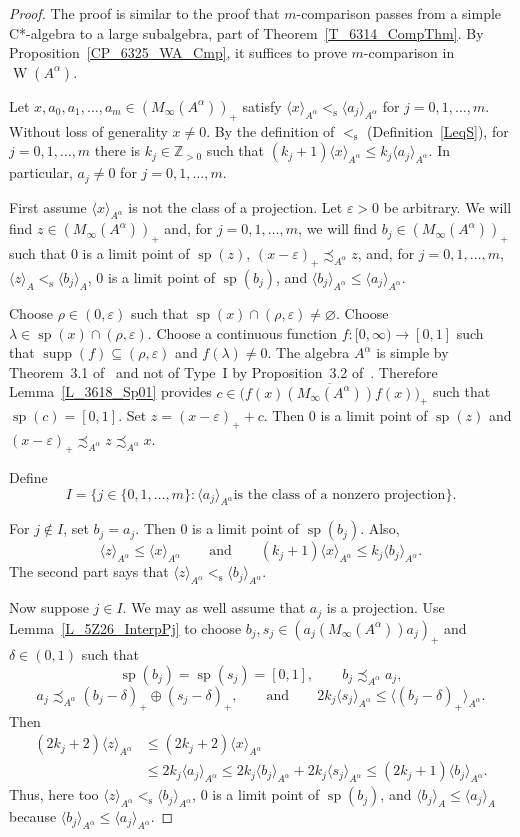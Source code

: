 \documentclass[10pt]{amsart}
\numberwithin{equation}{section}
\theoremstyle{definition}
\newcommand{\af}{\alpha}
\newcommand{\dt}{\delta}
\newcommand{\ep}{\varepsilon}
\newcommand{\ld}{\lambda}
\newcommand{\rh}{\rho}
\newcommand{\N}{{\mathbb{Z}}_{> 0}}
\newcommand{\spec}{{\operatorname{sp}}}
\newcommand{\supp}{{\operatorname{supp}}}
\newcommand{\W}{{\operatorname{W}}}
\newcommand{\andeqn}{\qquad {\mbox{and}} \qquad}
\newcommand{\Wolog}{Without loss of generality}
\newcommand{\ca}{C*-algebra}
\newcommand{\pj}{projection}
\newcommand{\cfn}{continuous function}
\renewcommand{\S}{\subseteq}
\newcommand{\I}{\infty}
\newcommand{\E}{\varnothing}
\newcommand{\cc}[1]{\langle #1 \rangle}
\newcommand{\ccA}[1]{\langle #1 \rangle_A}
\newcommand{\les}{<_{\operatorname{s}}}
\newcommand{\ccAf}[1]{\langle #1 \rangle_{A^{\alpha}}}
\begin{document}
\begin{proof}
The proof is similar to the proof that $m$-comparison passes from
a simple \ca{} to a large subalgebra, part of Theorem~\ref{T_6314_CompThm}.
By Proposition~\ref{CP_6325_WA_Cmp}, it suffices to prove
$m$-comparison in $\W (A^{\alpha})$.

Let $x, a_0, a_1, \ldots, a_m \in (M_{\infty} (A^{\alpha}))_{+}$ satisfy
$\cc{x}_{A^{\alpha}} \les \cc{a_j}_{A^{\alpha}}$ for $j = 0, 1, \ldots, m$.
\Wolog{} $x \neq 0$.
By the definition of $\les$ (Definition~\ref{LeqS}),
for $j = 0, 1, \ldots, m$ there is $k_j \in \N$
such that $(k_j + 1) \ccAf{x} \leq k_j \ccAf{a_j}$.
In particular, $a_j \neq 0$ for $j = 0, 1, \ldots, m$.

First assume $\cc{x}_{A^{\alpha}}$ is not the class of a projection.
Let $\varepsilon > 0$ be arbitrary.
We will find $z \in (M_{\infty} (A^{\alpha}))_{+}$
and, for $j = 0, 1, \ldots, m$,
we will find $b_j \in (M_{\infty} (A^{\alpha}))_{+}$
such that $0$ is a limit point of $\spec (z)$,
$(x - \ep)_{+} \precsim_{A^{\alpha}} z$,
and, for $j = 0, 1, \ldots, m$, $\ccA{z} \les \ccA{b_j}$,
$0$ is a limit point of $\spec (b_j)$, and $\ccAf{b_j} \leq \ccAf{a_j}$.

Choose $\rh \in (0, \ep)$ such that $\spec (x) \cap (\rh, \ep) \neq \E$.
Choose $\ld \in \spec (x) \cap (\rh, \ep)$.
Choose a \cfn{} $f \colon [0, \I) \to [0, 1]$ such that
$\supp (f) \S (\rh, \ep)$ and $f (\ld) \neq 0$.
The algebra $A^{\alpha}$ is simple
by Theorem~3.1 of~\cite{MohPhil2021TRP} and not of Type~I
by Proposition~3.2 of~\cite{MohPhil2021TRP}.
Therefore Lemma~\ref{L_3618_Sp01} provides
$c \in \bigl( {\overline{f (x) (M_{\infty} (A^{\alpha})) f (x)}} \bigr)_{+}$
such that $\spec (c) = [0, 1]$.
Set $z = (x - \ep)_{+} + c$.
Then $0$ is a limit point of $\spec (z)$ and
$(x - \ep)_{+} \precsim_{A^{\alpha}} z \precsim_{A^{\alpha}} x$.

Define
\[
I = \bigl\{ j \in \{0, 1, \ldots, m\} \colon
 {\mbox{$\cc{a_j}_{A^{\alpha}}$
    is the class of a nonzero projection}} \bigr\}.
\]

For $j \not\in I$, set $b_j = a_j$.
Then $0$ is a limit point of $\spec (b_j)$.
Also,
\[
\ccAf{z} \leq \ccAf{x}
\andeqn
(k_j + 1) \ccAf{x} \leq k_j \ccAf{b_j}.
\]
The second part says that $\cc{z}_{A^{\af}} \les \cc{b_j}_{A^{\af}}$.

Now suppose $j \in I$.
We may as well assume that $a_j$ is a \pj.
Use Lemma~\ref{L_5Z26_InterpPj} to choose
$b_j, s_j \in (a_j (M_{\infty} (A^{\alpha})) a_j)_{+}$ and $\dt \in (0, 1)$
such that
\[
\spec (b_j) = \spec (s_j) = [0, 1],
\qquad
b_j \precsim_{A^{\alpha}} a_j,
\]
\[
a_j \precsim_{A^{\alpha}} (b_j - \dt)_{+} \oplus (s_j - \dt)_{+},
\qquad {\mbox{and}} \qquad
2 k_j \ccAf{s_j} \leq \ccAf{(b_j - \dt)_{+}}.
\]
Then
\[
\begin{split}
(2 k_j + 2) \ccAf{z}
& \leq (2 k_j + 2) \ccAf{x}
\\
& \leq 2 k_j \ccAf{a_j}
  \leq 2 k_j \ccAf{b_j} + 2 k_j \ccAf{s_j}
  \leq (2 k_j + 1) \ccAf{b_j}.
\end{split}
\]
Thus, here too $\ccAf{z} \les \ccAf{b_j}$,
$0$ is a limit point of $\spec (b_j)$,
and $\ccA{b_j} \leq \ccA{a_j}$ because $\ccAf{b_j} \leq \ccAf{a_j}$.


\end{proof}
\end{document}

